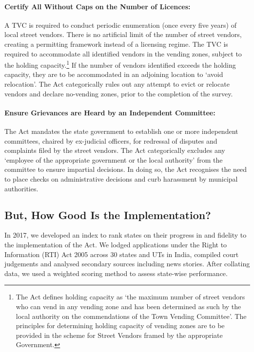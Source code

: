 \documentclass[a4paper, 12pt, twoside]{article}
\begin{document}
{\paragraph*{Certify All Without Caps on the Number of Licences:} A TVC is required to conduct periodic enumeration (once every five years) of local street vendors. There is no artificial limit of the number of street vendors, creating a permitting framework instead of a licensing regime. The TVC is required to accommodate all identified vendors in the vending zones, subject to the holding capacity.\footnote{The Act defines holding capacity as `the maximum number of street vendors who can vend in any vending zone and has been determined as such by the local authority on the commendations of the Town Vending Committee'. The principles for determining holding capacity of vending zones are to be provided in the scheme for Street Vendors framed by the appropriate Government.} If the number of vendors identified exceeds the holding capacity, they are to be accommodated in an adjoining location to `avoid relocation'. The Act categorically rules out any attempt to evict or relocate vendors and declare no-vending zones, prior to the completion of the survey.

\paragraph{Ensure Grievances are Heard by an Independent Committee:} The Act mandates the state government to establish one or more independent committees, chaired by ex-judicial officers, for redressal of disputes and complaints filed by the street vendors. The Act categorically excludes any `employee of the appropriate government or the local authority' from the committee to ensure impartial decisions. In doing so, the Act recognises the need to place checks on administrative decisions and curb harassment by municipal authorities.

\subsection*{But, How Good Is the Implementation?}

In 2017, we developed an index to rank states on their progress in and fidelity to the implementation of the Act. We lodged applications under the Right to Information (RTI) Act 2005 across 30 states and UTs in India, compiled court judgements and analysed secondary sources including news stories. After collating data, we used a weighted scoring method to assess state-wise performance.

}
\end{document}

